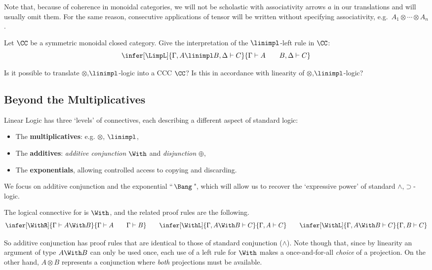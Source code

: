 \documentclass[12pt]{article}
\begin{document}
%
Note that, because of coherence in monoidal categories, we will not be scholastic with associativity arrows $a$ in our translations and will usually omit them. For the same reason, consecutive applications of tensor will be written without specifying associativity, e.g.~$A_1\otimes\cdots\otimes A_n$.

\begin{myexercise} Let $\CC$ be a symmetric monoidal closed category. Give the interpretation of the $\linimpl$-left rule in $\CC$:
        \[ \infer[\LimpL]{\Gamma , A \linimpl B, \Delta \vdash C}{\Gamma \vdash A \qquad B, \Delta \vdash C} \]
\end{myexercise}

\begin{myexercise}
Is it possible to translate $\otimes$,$\linimpl$-logic into a CCC $\CC$? Is this in accordance with linearity of $\otimes$,$\linimpl$-logic?
\end{myexercise}


\subsection{Beyond the Multiplicatives}
Linear Logic has three `levels' of connectives, each describing a different aspect of standard logic:
\begin{itemize}
\item The \textbf{multiplicatives}: e.g. $\otimes$, $\linimpl$,
\item The \textbf{additives}: \emph{additive conjunction} $\With$ and \emph{disjunction} $\oplus$,
\item The \textbf{exponentials}, allowing controlled access to copying and  discarding.
\end{itemize}
%
We focus on additive conjunction and the exponential ``\,$\Bang$\,", which will allow us to recover the `expressive power' of standard
$\wedge$,$\supset$-logic.

\begin{mydefinition}\label{d:With} The logical connective for  is $\With$, and the related proof rules are the following.
\[\infer[\WithR]{\Gamma \vdash A \With B}{\Gamma \vdash A \qquad \Gamma \vdash B}
\qquad \infer[\WithL]{\Gamma , A \With B \vdash C}{\Gamma , A \vdash C} \qquad \infer[\WithL]{\Gamma , A \With B \vdash C}{\Gamma , B \vdash C}
\]\deq[-1]
\end{mydefinition}
So additive conjunction has proof rules that are identical to those of standard conjunction ($\wedge$). Note though that, since by linearity an
argument of type $A \With B$ can only be used once, each use of a left rule for $\With$ makes a once-and-for-all \emph{choice} of a projection. On the
other hand, $A\otimes B$ represents a conjunction where \emph{both} projections must be available.
\end{document}
